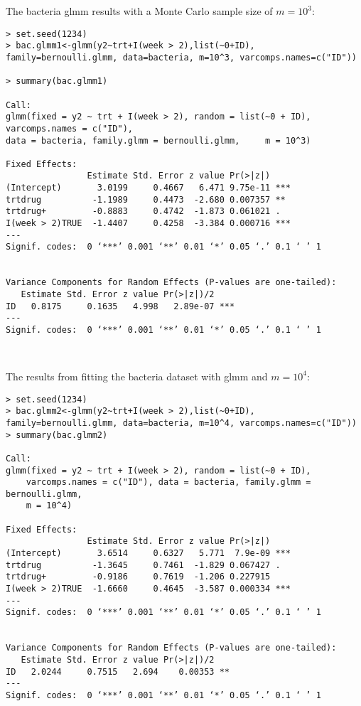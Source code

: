 \documentclass{article}
\begin{document}
The bacteria glmm results with a  Monte Carlo sample size of $m=10^3$:
\begin{verbatim}
> set.seed(1234)
> bac.glmm1<-glmm(y2~trt+I(week > 2),list(~0+ID), 
family=bernoulli.glmm, data=bacteria, m=10^3, varcomps.names=c("ID"))

> summary(bac.glmm1)

Call:
glmm(fixed = y2 ~ trt + I(week > 2), random = list(~0 + ID),  varcomps.names = c("ID"), 
data = bacteria, family.glmm = bernoulli.glmm,     m = 10^3)

Fixed Effects:
                Estimate Std. Error z value Pr(>|z|)    
(Intercept)       3.0199     0.4667   6.471 9.75e-11 ***
trtdrug          -1.1989     0.4473  -2.680 0.007357 ** 
trtdrug+         -0.8883     0.4742  -1.873 0.061021 .  
I(week > 2)TRUE  -1.4407     0.4258  -3.384 0.000716 ***
---
Signif. codes:  0 ‘***’ 0.001 ‘**’ 0.01 ‘*’ 0.05 ‘.’ 0.1 ‘ ’ 1


Variance Components for Random Effects (P-values are one-tailed):
   Estimate Std. Error z value Pr(>|z|)/2    
ID   0.8175     0.1635   4.998   2.89e-07 ***
---
Signif. codes:  0 ‘***’ 0.001 ‘**’ 0.01 ‘*’ 0.05 ‘.’ 0.1 ‘ ’ 1



\end{verbatim}
The results from fitting the bacteria dataset with glmm and $m=10^4$:

\begin{verbatim}
> set.seed(1234)
> bac.glmm2<-glmm(y2~trt+I(week > 2),list(~0+ID), family=bernoulli.glmm, data=bacteria, m=10^4, varcomps.names=c("ID"))
> summary(bac.glmm2)

Call:
glmm(fixed = y2 ~ trt + I(week > 2), random = list(~0 + ID), 
    varcomps.names = c("ID"), data = bacteria, family.glmm = bernoulli.glmm, 
    m = 10^4)

Fixed Effects:
                Estimate Std. Error z value Pr(>|z|)    
(Intercept)       3.6514     0.6327   5.771  7.9e-09 ***
trtdrug          -1.3645     0.7461  -1.829 0.067427 .  
trtdrug+         -0.9186     0.7619  -1.206 0.227915    
I(week > 2)TRUE  -1.6660     0.4645  -3.587 0.000334 ***
---
Signif. codes:  0 ‘***’ 0.001 ‘**’ 0.01 ‘*’ 0.05 ‘.’ 0.1 ‘ ’ 1


Variance Components for Random Effects (P-values are one-tailed):
   Estimate Std. Error z value Pr(>|z|)/2   
ID   2.0244     0.7515   2.694    0.00353 **
---
Signif. codes:  0 ‘***’ 0.001 ‘**’ 0.01 ‘*’ 0.05 ‘.’ 0.1 ‘ ’ 1

\end{verbatim}
\end{document}
